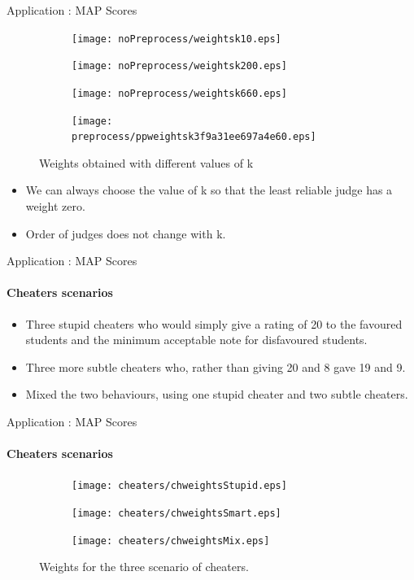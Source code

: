 \begin{frame}{Application : MAP Scores}
\begin{figure}[h!]
\centering
\begin{subfigure}[b]{0.24\textwidth}
    \centering
    \texttt{[image: noPreprocess/weightsk10.eps]}
\end{subfigure}
\begin{subfigure}[b]{0.24\textwidth}
    \centering
    \texttt{[image: noPreprocess/weightsk200.eps]}
\end{subfigure}
\begin{subfigure}[b]{0.24\textwidth}
    \centering
    \texttt{[image: noPreprocess/weightsk660.eps]}
\end{subfigure}
\begin{subfigure}[b]{0.24\textwidth}
\centering
\texttt{[image: preprocess/ppweightsk3f9a31ee697a4e60.eps]}
\end{subfigure}
\caption{Weights obtained with different values of k}
\end{figure}
\begin{itemize}
    \item We can always choose the value of k so that the least reliable judge has a weight zero.
    \item Order of judges does not change with k.
\end{itemize}
\end{frame}

\begin{frame}{Application : MAP Scores}
    \framesubtitle{Cheaters scenarios}
    \begin{itemize}
        \item Three stupid cheaters who would simply give a rating of 20 to the favoured students and the minimum acceptable note for disfavoured students.
        \item Three more subtle cheaters who, rather than giving 20 and 8 gave 19 and 9.
        \item Mixed the two behaviours, using one stupid cheater and two subtle cheaters.
    \end{itemize}
\end{frame}

\begin{frame}{Application : MAP Scores}
    \framesubtitle{Cheaters scenarios}
\begin{figure}[!ht]
\begin{subfigure}[b]{0.32\textwidth}
\texttt{[image: cheaters/chweightsStupid.eps]}
\end{subfigure}
\begin{subfigure}[b]{0.32\textwidth}
\texttt{[image: cheaters/chweightsSmart.eps]}
\end{subfigure}
\begin{subfigure}[b]{0.32\textwidth}
\texttt{[image: cheaters/chweightsMix.eps]}
\end{subfigure}
\caption{Weights for the three scenario of cheaters\label{weightch}.}
\end{figure}
\end{frame}

